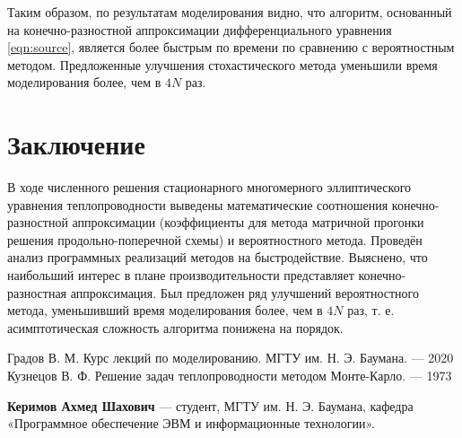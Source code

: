 \documentclass[12pt, a4paper]{article}
\begin{document}
Таким образом, по результатам моделирования видно, что алгоритм, основанный на конечно-разностной аппроксимации дифференциального уравнения \eqref{eqn:source}, является более быстрым по времени по сравнению с вероятностным методом. Предложенные улучшения стохастического метода уменьшили время моделирования более, чем в $4N$ раз.

\section*{Заключение}

В ходе численного решения стационарного многомерного эллиптического уравнения теплопроводности выведены математические соотношения конечно-разностной аппроксимации (коэффициенты для метода матричной прогонки решения продольно-поперечной схемы) и вероятностного метода. Проведён анализ программных реализаций методов на быстродействие. Выяснено, что наибольший интерес в плане производительности представляет конечно-разностная аппроксимация. Был предложен ряд улучшений вероятностного метода, уменьшивший время моделирования более, чем в $4N$ раз, т. е. асимптотическая сложность алгоритма понижена на порядок.

\begin{thebibliography}{5}
	 Градов В. М. Курс лекций по моделированию. МГТУ им. Н. Э. Баумана. — 2020
	 Кузнецов В. Ф. Решение задач теплопроводности методом Монте-Карло. — 1973
\end{thebibliography}

\noindent \textbf{Керимов Ахмед Шахович} — студент, МГТУ им. Н. Э. Баумана, кафедра «Программное обеспечение ЭВМ и информационные технологии».
\end{document}
